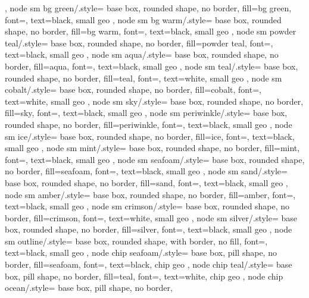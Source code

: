{{	},
	node sm bg green/.style={
		base box, rounded shape, no border,
		fill=bg green, font=\small\sffamily,
		text=black, small geo
	},
	node sm bg warm/.style={
		base box, rounded shape, no border,
		fill=bg warm, font=\small\sffamily,
		text=black, small geo
	},
	node sm powder teal/.style={
		base box, rounded shape, no border,
		fill=powder teal, font=\small\sffamily,
		text=black, small geo
	},
	node sm aqua/.style={
		base box, rounded shape, no border,
		fill=aqua, font=\small\sffamily,
		text=black, small geo
	},
	node sm teal/.style={
		base box, rounded shape, no border,
		fill=teal, font=\small\sffamily,
		text=white, small geo
	},
	node sm cobalt/.style={
		base box, rounded shape, no border,
		fill=cobalt, font=\small\sffamily,
		text=white, small geo
	},
	node sm sky/.style={
		base box, rounded shape, no border,
		fill=sky, font=\small\sffamily,
		text=black, small geo
	},
	node sm periwinkle/.style={
		base box, rounded shape, no border,
		fill=periwinkle, font=\small\sffamily,
		text=black, small geo
	},
	node sm ice/.style={
		base box, rounded shape, no border,
		fill=ice, font=\small\sffamily,
		text=black, small geo
	},
	node sm mint/.style={
		base box, rounded shape, no border,
		fill=mint, font=\small\sffamily,
		text=black, small geo
	},
	node sm seafoam/.style={
		base box, rounded shape, no border,
		fill=seafoam, font=\small\sffamily,
		text=black, small geo
	},
	node sm sand/.style={
		base box, rounded shape, no border,
		fill=sand, font=\small\sffamily,
		text=black, small geo
	},
	node sm amber/.style={
		base box, rounded shape, no border,
		fill=amber, font=\small\sffamily,
		text=black, small geo
	},
	node sm crimson/.style={
		base box, rounded shape, no border,
		fill=crimson, font=\small\sffamily,
		text=white, small geo
	},
	node sm silver/.style={
		base box, rounded shape, no border,
		fill=silver, font=\small\sffamily,
		text=black, small geo
	},
	node sm outline/.style={
		base box, rounded shape, with border,
		no fill, font=\small\sffamily,
		text=black, small geo
	},
	node chip seafoam/.style={
		base box, pill shape, no border,
		fill=seafoam, font=\footnotesize\sffamily,
		text=black, chip geo
	},
	node chip teal/.style={
		base box, pill shape, no border,
		fill=teal, font=\footnotesize\sffamily,
		text=white, chip geo
	},
	node chip ocean/.style={
		base box, pill shape, no border,
}}
